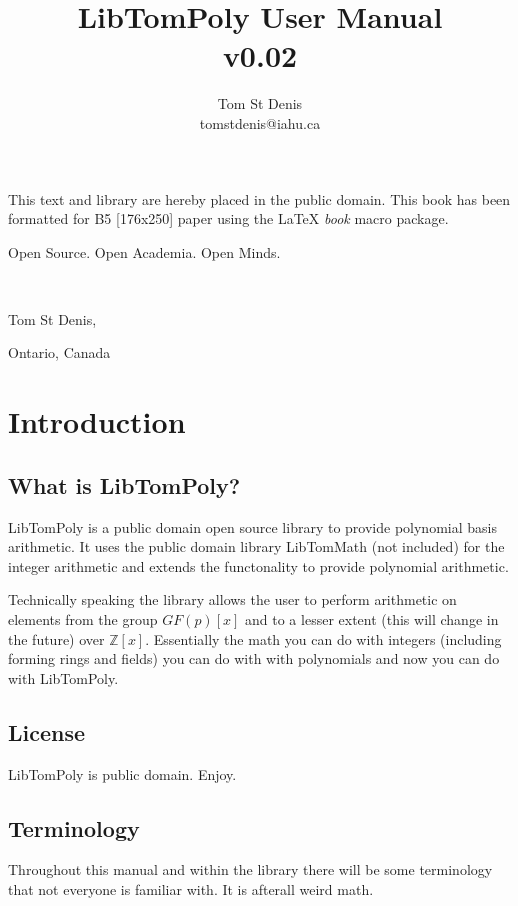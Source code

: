\documentclass[b5paper]{book}
\def\Z{{\mathbb Z}}
\begin{document}
\frontmatter
\pagestyle{empty}
\title{LibTomPoly User Manual \\ v0.02}
\author{Tom St Denis \\ tomstdenis@iahu.ca}
\maketitle
This text and library are  hereby placed in the public domain.  This book has been 
formatted for B5 [176x250] paper using the \LaTeX{} {\em book} macro package.

\vspace{10cm}

\begin{flushright}Open Source.  Open Academia.  Open Minds.

\mbox{ }

Tom St Denis,

Ontario, Canada
\end{flushright}

\tableofcontents
\listoffigures
\mainmatter
\pagestyle{headings}
\chapter{Introduction}
\section{What is LibTomPoly?}
LibTomPoly is a public domain open source library to provide polynomial basis arithmetic.  It uses the public domain
library LibTomMath (not included) for the integer arithmetic and extends the functonality to provide polynomial arithmetic.

Technically speaking the library allows the user to perform arithmetic on elements from the group $GF(p)[x]$ and to 
a lesser extent (this will change in the future) over $\Z[x]$.  Essentially the math you can do with integers (including
forming rings and fields) you can do with with polynomials and now you can do with LibTomPoly.

\section{License}
LibTomPoly is public domain.  Enjoy.

\section{Terminology}
Throughout this manual and within the library there will be some terminology that not everyone is familiar with.  It is afterall
weird math.
\end{document}
